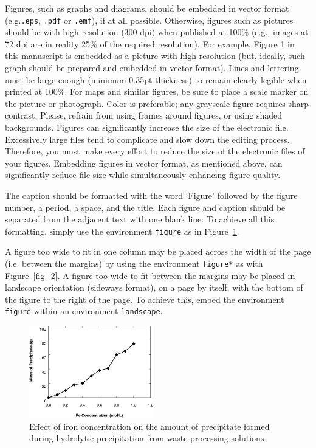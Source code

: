 \documentclass[a4paper, times, 10pt, twocolumn, twoside]{article}
\begin{document}
Figures, such as graphs and diagrams, should be embedded in vector format (e.g.\verb|.eps|, \verb|.pdf| or \verb|.emf|), if at all possible. 
Otherwise, figures such as pictures should be with high resolution (300 dpi) when published at 100\% (e.g., images at 72 dpi are in reality 25\% of the required resolution).
For example, Figure 1 in this manuscript is embedded as a picture with high resolution (but, ideally, such graph should be prepared and embedded in vector format).
Lines and lettering must be large enough (minimum 0.35pt thickness) to remain clearly legible when printed at 100\%. 
For maps and similar figures, be sure to place a scale marker on the picture or photograph. 
Color is preferable; any grayscale figure requires sharp contrast. 
Please, refrain from using frames around figures, or using shaded backgrounds.
Figures can significantly increase the size of the electronic file. Excessively large files tend to complicate and slow down the editing process. Therefore, you must make every effort to reduce the size of the electronic files of your figures. Embedding figures in vector format, as mentioned above, can significantly reduce file size while simultaneously enhancing figure quality.

The caption should be formatted with the word `Figure' followed by the figure number, a period, a space, and the title. 
Each figure and caption should be separated from the adjacent text with one blank line. 
To achieve all this formatting, simply use the environment \verb|figure| as in Figure~\ref{fig_1}. 

A figure too wide to fit in one column may be placed across the width of the page (i.e. between the margins) by using the environment \verb|figure*| as with Figure~\ref{fig_2}. 
A figure too wide to fit between the margins may be placed in landscape orientation (sideways format), on a page by itself, with the bottom of the figure to the right of the page.
To achieve this, embed the environment \verb|figure| within an environment \verb|landscape|.

\begin{figure}[!htb]
    \centering
    \includegraphics[width=0.48\textwidth]{ISARC_ExampleFigure.eps}
    \caption{Effect of iron concentration on the amount of precipitate formed during hydrolytic precipitation from waste processing solutions}
    \label{fig_1}
\end{figure}
\end{document}
